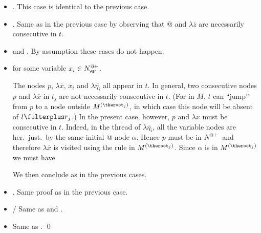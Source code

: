 \begin{itemize}
    \item {} . This case is identical to the previous case.

    \item {}
          . Same as in the previous case by observing that @ and $\lambda \overline{z}$
are necessarily consecutive in $t$.

    \item {} and . By assumption these cases do not happen.

    \item {}
     for some
        variable $x_i \in N_{\sf var}^{@\vdash}$.

    The nodes $p$, $\lambda \overline{x}$, $x_i$ and $\lambda \overline{\eta_i}$
all appear in $t$. In general, two consecutive nodes $p$ and $\lambda \overline{x}$ in $t_j$ are not necessarily consecutive in $t$. (For in $M$, $t$ can ``jump'' from $p$ to a node outside $M^{(\theroot_j)}$, in which case this node will be absent of $t\filterplus r_j$.)
In the present case, however, $p$ and $\lambda \overline{x}$ must be consecutive in $t$.
Indeed, in the thread of $\lambda \overline{\eta_i}$, all the variable nodes are her.\ just.\ by the same initial @-node $\alpha$. Hence 
$p$ must be in $N^{@\vdash}$ and therefore $\lambda \overline{x}$ is visited using the rule  in $M^{(\theroot_j)}$.
Since $\alpha$ is in $M^{(\theroot_j)}$ we must have




We then conclude as in the previous cases.



    \item {}. Same proof as in the previous case.
    \item {}/ Same as  and .
    \item {} Same as  .
\qed
  \end{itemize}



